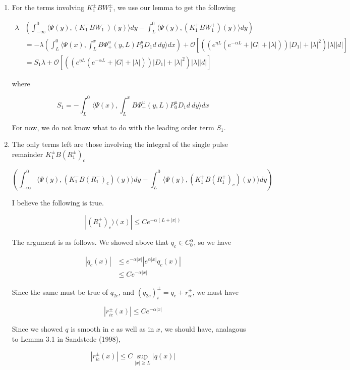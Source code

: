\documentclass[12pt]{article}
\begin{document}
\begin{enumerate}
\item For the terms involving $K_1^\pm B W_1^\pm$, we use our lemma to get the following

\begin{align*}
\lambda&\left( \int_{-\infty}^0 \langle \Psi(y), (K_1^- B W_1^-)(y) \rangle dy - \int_{L}^0 \langle \Psi(y), (K_1^+ B W_1^+)(y) \rangle dy \right) \\
&= -\lambda \left( \int_{L}^0 \langle \Psi(x), \int_{L}^x B\Phi^u_+(y, L) P_0^u D_1 d \:dy \rangle dx \right) + \mathcal{O} \left[ \left(\left( e^{\eta L}(e^{-\alpha L} + |G| + |\lambda|) \right)|D_1| + |\lambda|^2 \right)|\lambda| |d|\right] \\
&= S_1 \lambda + \mathcal{O} \left[ \left(\left( e^{\eta L}(e^{-\alpha L} + |G| + |\lambda|) \right)|D_1| + |\lambda|^2 \right)|\lambda| |d|\right]
\end{align*}

where

\[
S_1 = -\int_{L}^0 \langle \Psi(x), \int_{L}^x B\Phi^u_+(y, L) P_0^u D_1 d\:dy \rangle dx 
\]

For now, we do not know what to do with the leading order term $S_1$.

\item The only terms left are those involving the integral of the single pulse remainder $K_1^\pm B (R_1^\pm)_c$

\[
\left( \int_{-\infty}^0 \langle \Psi(y), (K_1^- B (R_1^-)_c)(y) \rangle dy - \int_{L}^0 \langle \Psi(y), (K_1^+ B (R_1^+)_c)(y) \rangle dy \right) 
\]

I believe the following is true.

\[
|(R_1^+)_c)(x)| \leq Ce^{-\alpha(L + |x|)}
\]

The argument is as follows. We showed above that $q_c \in C_0^\alpha$, so we have

\begin{align*}
|q_c(x)| &\leq e^{-\alpha |x|} | e^{\alpha |x|} q_c(x) | \\
&\leq C e^{-\alpha |x|} 
\end{align*} 

Since the same must be true of $q_{2c}$, and $(q_{2c})_i^\pm = q_c + r_{ic}^\pm$, we must have

\[
|r_{ic}^\pm(x)| \leq C e^{-\alpha |x|} 
\] 

Since we showed $q$ is smooth in $c$ as well as in $x$, we should have, analagous to Lemma 3.1 in Sandstede (1998),

\[
|r_{ic}^\pm(x)| \leq C \sup_{|x| \geq L} |q(x)|
\]


\end{enumerate}
\end{document}
